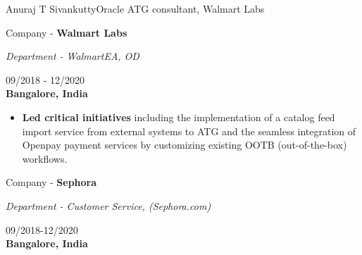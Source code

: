 \documentclass{article}
\begin{document}
\begin{cv}{Anuraj T Sivankutty}{Oracle ATG consultant, Walmart Labs}
\begin{cvevent}[November-2018][December-2020]
\begin{itemize}
    \end{itemize}
\end{cvevent}


\begin{cvevent}[September - 2018][December - 2020]

    \begin{center}
      \begin{minipage}{0.6\textwidth}
        Company - \textbf{Walmart Labs}
        \vspace{0.1cm}   
        
        \textit{Department - WalmartEA, OD}
      \end{minipage}
      \hfill
      \begin{minipage}{0.35\textwidth}
          \small{09/2018 - 12/2020}\\
        \textbf{Bangalore, India}
      \end{minipage}
    \end{center}
    
    \begin{itemize}
        \item  \textbf{Led critical initiatives} including the implementation of a catalog feed import service from external systems to ATG and the seamless integration of Openpay payment services by customizing existing OOTB (out-of-the-box) workflows.

    \end{itemize}
\end{cvevent}


\begin{cvevent}[August - 2017][September - 2018]
        \begin{center}
      \begin{minipage}{0.6\textwidth}
        Company - \textbf{Sephora}
        \vspace{0.1cm}
        
        \textit{Department - Customer Service, (Sephora.com)}
      \end{minipage}
      \hfill
      \begin{minipage}{0.35\textwidth}
          \small{09/2018-12/2020}\\
        \textbf{Bangalore, India}
      \end{minipage}
    \end{center}
    
    \begin{itemize}


\end{itemize}
\end{cvevent}
\end{cv}
\end{document}
